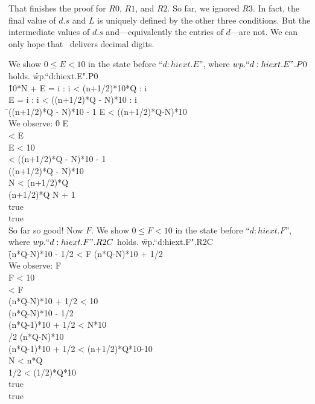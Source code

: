 That finishes the proof for $R0$, $R1$, and $R2$.  So far, we
ignored $R3$.  In fact, the final value of $d.s$ and $L$ is uniquely
defined by the other three conditions.  But the intermediate values
of $d.s$ and---equivalently the entries of $d$---are not. We can
only hope that \out\ delivers decimal digits.

We show $0 \le E < 10$ in the state before
``$d:hiext.E$'', where $wp.``d:hiext.E".P0$ holds.
\f    wp.``d:hiext.E".P0\\
\f    10*N + E = \<\mx i : i < (n+1/2)*10*Q : i \>\\
\f    E = \<\mx i : i < \bigl((n+1/2)*Q - N\bigr)*10 : i \>\\
\f   \bigl((n+1/2)*Q - N\bigr)*10 - 1 \le E < \bigl((n+1/2)*Q-N\bigr)*10 \\

We observe:
\f     0 \le E \\
  < E \\
       E < 10 \\
\dh{}
 < \bigl((n+1/2)*Q - N\bigr)*10 - 1 \\
      \bigl((n+1/2)*Q - N\bigr)*10  \\
\dh {}
\df   N < (n+1/2)*Q\\
      (n+1/2)*Q \le N + 1\\
\dh {}
\df  true\\
     true\\
\filbreak
So far so good! Now $F$.
We show $0 \le F < 10$ in the state before
``$d:hiext.F$'', where $wp.``d:hiext.F".R2C$ holds.
\f   wp.``d:hiext.F".R2C \\
\f   (n*Q-N)*10 - 1/2 < F \le (n*Q-N)*10 + 1/2\\
\filbreak
We observe:
 \le F \\
     F < 10 \\
\dh {}
 < F\\
    (n*Q-N)*10 + 1/2 < 10\\
\dh {}
 \le (n*Q-N)*10 - 1/2\\
    (n*Q-1)*10 + 1/2 < N*10\\
\dh {}
/2 \le (n*Q-N)*10\\
  (n*Q-1)*10 + 1/2 < (n+1/2)*Q*10-10\\
\dh {}
\df  N < n*Q\\
     1/2 < (1/2)*Q*10\\
\dh{}
\df true\\
    true\\
\filbreak

